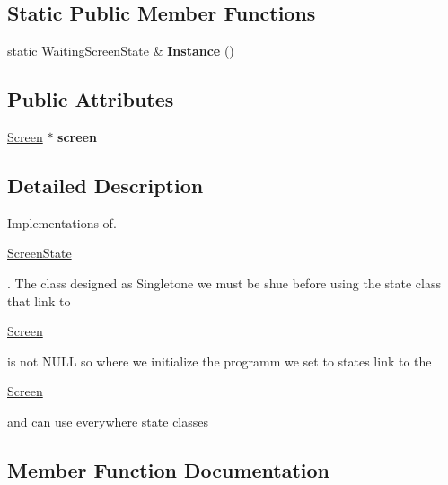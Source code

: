 \subsection*{Static Public Member Functions}
\begin{DoxyCompactItemize}
\item 
\hypertarget{class_waiting_screen_state_a0bba467dd415c8e5cadc5acaee5f64f5}{}static \hyperlink{class_waiting_screen_state}{Waiting\+Screen\+State} \& {\bfseries Instance} ()\label{class_waiting_screen_state_a0bba467dd415c8e5cadc5acaee5f64f5}

\end{DoxyCompactItemize}
\subsection*{Public Attributes}
\begin{DoxyCompactItemize}
\item 
\hypertarget{class_waiting_screen_state_ad10a8cdba52398cf2043ebe6f83b67ee}{}\hyperlink{class_screen}{Screen} $\ast$ {\bfseries screen}\label{class_waiting_screen_state_ad10a8cdba52398cf2043ebe6f83b67ee}

\end{DoxyCompactItemize}


\subsection{Detailed Description}
Implementations of. 


\begin{DoxyCode}
\hyperlink{class_screen_state}{ScreenState} 
\end{DoxyCode}
 . The class designed as Singletone we must be shue before using the state class that link to
\begin{DoxyCode}
\hyperlink{class_screen}{Screen} 
\end{DoxyCode}
 is not N\+U\+L\+L so where we initialize the programm we set to states link to the
\begin{DoxyCode}
\hyperlink{class_screen}{Screen} 
\end{DoxyCode}
 and can use everywhere state classes 

\subsection{Member Function Documentation}
\hypertarget{class_waiting_screen_state_ac22e314bd11df4ba4d5480da022f5862}{}
